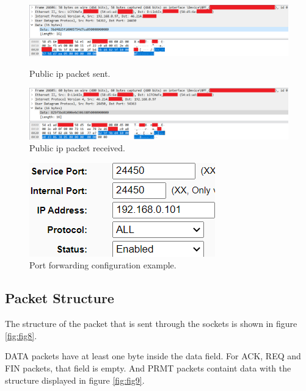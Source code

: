 \documentclass[12pt]{article}
\begin{document}
\begin{figure}[!htb]
	\begin{minipage}{0.48\textwidth}
		\centering
		\includegraphics[width=.9\linewidth]{PublicFinishSend.png}
		\caption{Public ip packet sent.}\label{fig:fig5}
	\end{minipage}\hfill
	\begin{minipage}{0.9\textwidth}
		\centering
		\includegraphics[width=.7\linewidth]{PublicFinishReceive.png}
		\caption{Public ip packet received.}\label{fig:fig6}
	\end{minipage}\hfill
\end{figure}

\begin{figure}[!htb]
	\centering
	\includegraphics[width=\linewidth]{PortForward.png}
	\caption{Port forwarding configuration example.}\label{fig:fig7}
\end{figure}

\subsection{Packet Structure}

The structure of the packet that is sent through the sockets is shown in figure \ref{fig:fig8}.

DATA packets have at least one byte inside the data field. For ACK, REQ and FIN packets, that field is empty. And PRMT packets containt data with the structure displayed in figure \ref{fig:fig9}.
\end{document}
